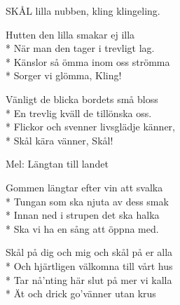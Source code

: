 \begin{SongText}
\begin{SongVerse}
        SKÅL lilla nubben, kling klingeling. 
    \end{SongVerse}
    \begin{SongVerse}
        Hutten den lilla smakar ej illa\\*%
        När man den tager i trevligt lag.\\*%
        Känslor så ömma inom oss strömma\\*%
        Sorger vi glömma, Kling!
    \end{SongVerse}
    \begin{SongVerse}
        Vänligt de blicka bordets små bloss\\*%
        En trevlig kväll de tillönska oss.\\*%
        Flickor och svenner livsglädje känner,\\*%
        Skål kära vänner, Skål! 
    \end{SongVerse}
\end{SongText}
\begin{SongText}
    \begin{SongInfo}
        Mel: Längtan till landet 
    \end{SongInfo}
    \begin{SongVerse}
        Gommen längtar efter vin att svalka\\*%
        Tungan som ska njuta av dess smak\\*%
        Innan ned i strupen det ska halka\\*%
        Ska vi ha en sång att öppna med.
    \end{SongVerse}
    \begin{SongVerse}
        Skål på dig och mig och skål på er alla\\*%
        Och hjärtligen välkomna till vårt hus\\*%
        Tar nå’nting här slut på mer vi kalla\\*%
        Ät och drick go’vänner utan krus
    \end{SongVerse}
\end{SongText}
\newpage